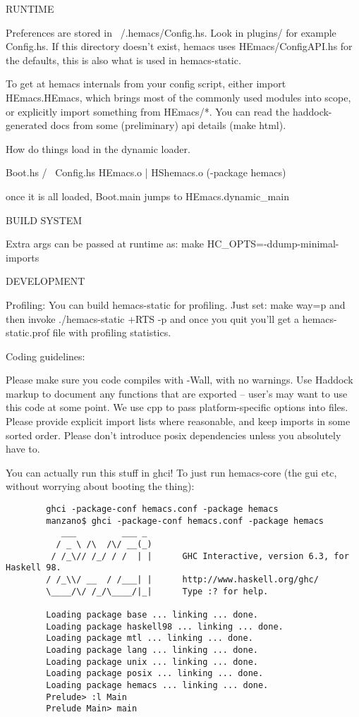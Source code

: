 RUNTIME

Preferences are stored in ~/.hemacs/Config.hs. Look in plugins/ for
example Config.hs. If this directory doesn't exist, hemacs uses
HEmacs/ConfigAPI.hs for the defaults, this is also what is used in
hemacs-static.

To get at hemacs internals from your config script, either import
HEmacs.HEmacs, which brings most of the commonly used modules into
scope, or explicitly import something from HEmacs/*. You can read the
haddock-generated docs from some (preliminary) api details (make
html).

How do things load in the dynamic loader.
        
           Boot.hs
          /      \
      Config.hs HEmacs.o
                  |
                HShemacs.o (-package hemacs)

once it is all loaded, Boot.main jumps to HEmacs.dynamic\_main

BUILD SYSTEM

Extra args can be passed at runtime as: make HC\_OPTS=-ddump-minimal-imports

DEVELOPMENT

Profiling:
You can build hemacs-static for profiling. Just set:
	make way=p
and then invoke
	./hemacs-static +RTS -p
and once you quit you'll get a hemacs-static.prof file with profiling
statistics.

Coding guidelines:

Please make sure you code compiles with -Wall, with no warnings. Use
Haddock markup to document any functions that are exported -- user's
may want to use this code at some point. We use cpp to pass
platform-specific options into files. Please provide explicit import
lists where reasonable, and keep imports in some sorted order.
Please don't introduce posix dependencies unless you absolutely have
to.

You can actually run this stuff in ghci! To just run hemacs-core (the gui etc,
without worrying about booting the thing):

\begin{verbatim}
        ghci -package-conf hemacs.conf -package hemacs
        manzano$ ghci -package-conf hemacs.conf -package hemacs
           ___         ___ _
          / _ \ /\  /\/ __(_)
         / /_\// /_/ / /  | |      GHC Interactive, version 6.3, for Haskell 98.
        / /_\\/ __  / /___| |      http://www.haskell.org/ghc/
        \____/\/ /_/\____/|_|      Type :? for help.

        Loading package base ... linking ... done.
        Loading package haskell98 ... linking ... done.
        Loading package mtl ... linking ... done.
        Loading package lang ... linking ... done.
        Loading package unix ... linking ... done.
        Loading package posix ... linking ... done.
        Loading package hemacs ... linking ... done.
        Prelude> :l Main
        Prelude Main> main
\end{verbatim}


